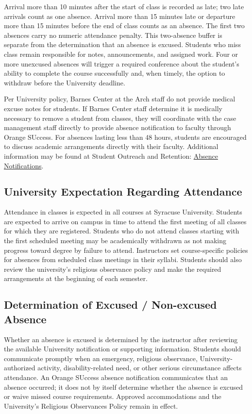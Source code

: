 \documentclass[11pt]{article}
\begin{document}
Arrival more than 10 minutes after the start of class is recorded as late; two late arrivals
count as one absence. Arrival more than 15 minutes late or departure more than 15 minutes
before the end of class counts as an absence. The first two absences carry no numeric
attendance penalty. This two-absence buffer is separate from the determination that an
absence is excused. Students who miss class remain responsible for notes, announcements, and
assigned work. Four or more unexcused absences will trigger a required conference about the
student's ability to complete the course successfully and, when timely, the option to
withdraw before the University deadline.

Per University policy, Barnes Center at the Arch staff do not provide medical excuse notes for
students. If Barnes Center staff determine it is medically necessary to remove a student from
classes, they will coordinate with the case management staff directly to provide absence
notification to faculty through Orange SUccess. For absences lasting less than 48 hours,
students are encouraged to discuss academic arrangements directly with their faculty.
Additional information may be found at Student Outreach and Retention:
\href{https://experience.syracuse.edu/soar/student-support/absence-notifications/}{Absence
Notifications}.

\subsection{University Expectation Regarding Attendance}

Attendance in classes is expected in all courses at Syracuse University. Students are expected
to arrive on campus in time to attend the first meeting of all classes for which they are
registered. Students who do not attend classes starting with the first scheduled meeting may
be academically withdrawn as not making progress toward degree by failure to attend.
Instructors set course-specific policies for absences from scheduled class meetings in their
syllabi. Students should also review the university's religious observance policy and make the
required arrangements at the beginning of each semester.

\subsection{Determination of Excused / Non-excused Absence}

Whether an absence is excused is determined by the instructor after reviewing the available
University notification or supporting information. Students should communicate promptly when
an emergency, religious observance, University-authorized activity, disability-related need,
or other serious circumstance affects attendance. An Orange SUccess absence notification
communicates that an absence occurred; it does not by itself determine whether the absence is
excused or waive missed course requirements. Approved accommodations and the University's
Religious Observances Policy remain in effect.
\end{document}
